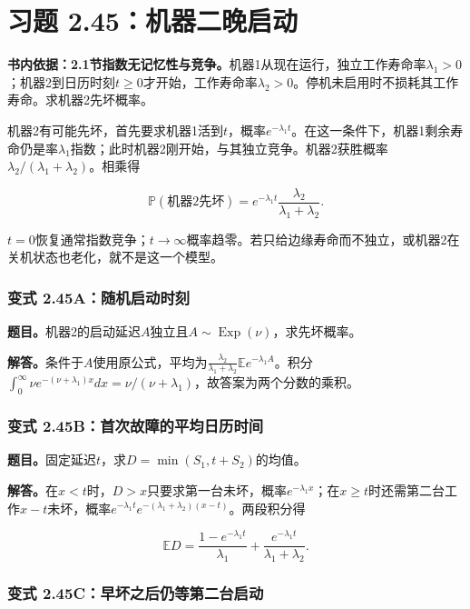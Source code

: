 \documentclass[12pt,a4paper,UTF8,fontset=fandol]{ctexart}
\begin{document}
\section{习题
2.45：机器二晚启动}\label{ux4e60ux9898-2.45ux673aux5668ux4e8cux665aux542fux52a8}

\textbf{书内依据：2.1节指数无记忆性与竞争。}机器1从现在运行，独立工作寿命率\(\lambda_1>0\)；机器2到日历时刻\(t\ge0\)才开始，工作寿命率\(\lambda_2>0\)。停机未启用时不损耗其工作寿命。求机器2先坏概率。

机器2有可能先坏，首先要求机器1活到\(t\)，概率\(e^{-\lambda_1t}\)。在这一条件下，机器1剩余寿命仍是率\(\lambda_1\)指数；此时机器2刚开始，与其独立竞争。机器2获胜概率\(\lambda_2/(\lambda_1+\lambda_2)\)。相乘得

\[\boxed{\mathbb P(\text{机器2先坏})
=e^{-\lambda_1t}\frac{\lambda_2}{\lambda_1+\lambda_2}.}\]

\(t=0\)恢复通常指数竞争；\(t\to\infty\)概率趋零。若只给边缘寿命而不独立，或机器2在关机状态也老化，就不是这一个模型。

\subsubsection{变式
2.45A：随机启动时刻}\label{ux53d8ux5f0f-2.45aux968fux673aux542fux52a8ux65f6ux523b}

\textbf{题目。}机器2的启动延迟\(A\)独立且\(A\sim\operatorname{Exp}(\nu)\)，求先坏概率。

\textbf{解答。}条件于\(A\)使用原公式，平均为\(\frac{\lambda_2}{\lambda_1+\lambda_2}\mathbb Ee^{-\lambda_1A}\)。积分\(\int_0^\infty \nu e^{-(\nu+\lambda_1)x}dx=\nu/(\nu+\lambda_1)\)，故答案为两个分数的乘积。

\subsubsection{变式
2.45B：首次故障的平均日历时间}\label{ux53d8ux5f0f-2.45bux9996ux6b21ux6545ux969cux7684ux5e73ux5747ux65e5ux5386ux65f6ux95f4}

\textbf{题目。}固定延迟\(t\)，求\(D=\min(S_1,t+S_2)\)的均值。

\textbf{解答。}在\(x<t\)时，\(D>x\)只要求第一台未坏，概率\(e^{-\lambda_1x}\)；在\(x\ge t\)时还需第二台工作\(x-t\)未坏，概率\(e^{-\lambda_1t}e^{-(\lambda_1+\lambda_2)(x-t)}\)。两段积分得

\[\mathbb ED=\frac{1-e^{-\lambda_1t}}{\lambda_1}
+\frac{e^{-\lambda_1t}}{\lambda_1+\lambda_2}.\]

\subsubsection{变式
2.45C：早坏之后仍等第二台启动}\label{ux53d8ux5f0f-2.45cux65e9ux574fux4e4bux540eux4ecdux7b49ux7b2cux4e8cux53f0ux542fux52a8}
\end{document}
